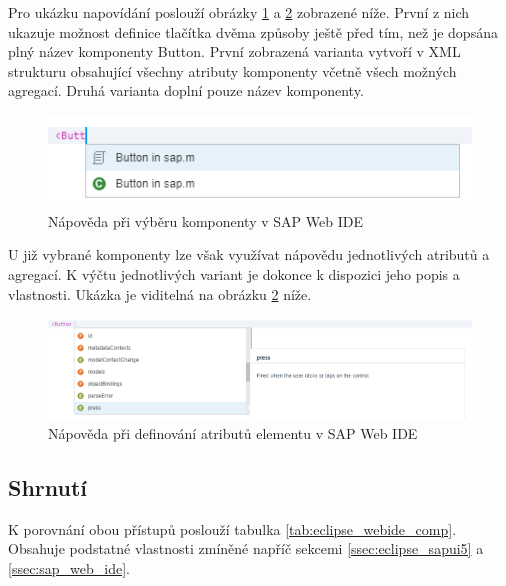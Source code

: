 \documentclass[thesis=M,czech]{FITthesis}[2012/06/26]
\begin{document}
Pro ukázku napovídání poslouží obrázky \ref{img:web_ide_help1} a \ref{img:web_ide_help2} zobrazené níže. První z nich ukazuje možnost definice tlačítka dvěma způsoby ještě před tím, než je dopsána plný název komponenty Button. První zobrazená varianta vytvoří v XML strukturu obsahující všechny atributy komponenty včetně všech možných agregací. Druhá varianta doplní pouze název komponenty. 
\begin{figure}[H]
	\centering
	\includegraphics[width=1\textwidth]{images/web_ide_help1}
	\caption{Nápověda při výběru komponenty v SAP Web IDE}
	\label{img:web_ide_help1}
\end{figure}
U již vybrané komponenty lze však využívat nápovědu jednotlivých atributů a agregací. K výčtu jednotlivých variant je dokonce k dispozici jeho popis a vlastnosti. Ukázka je viditelná na obrázku \ref{img:web_ide_help2} níže. 
\begin{figure}[H]
	\centering
	\includegraphics[width=1\textwidth]{images/web_ide_help2}
	\caption{Nápověda při definování atributů elementu v SAP Web IDE}
	\label{img:web_ide_help2}
\end{figure}

\subsection{Shrnutí}
K porovnání obou přístupů poslouží tabulka \ref{tab:eclipse_webide_comp}. Obsahuje podstatné vlastnosti zmíněné napříč sekcemi \ref{ssec:eclipse_sapui5} a \ref{ssec:sap_web_ide}. 
\end{document}
